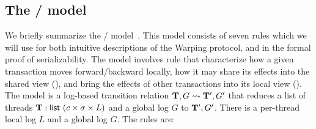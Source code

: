 \newcommand\STEP{{\sc step}}
\newcommand\BEGIN{{\sc begin}}
\newcommand\LOCAL{{\sc local}}
\newcommand\FIN{{\sc fin}}
\newcommand\FORK{{\sc fork}}

\subsection{The \PUSH{}/\PULL{} model}

We briefly summarize the \PUSH{}/\PULL{} model~\cite{KoskinenP15}. This model consists of
seven rules which we will use for both intuitive descriptions of the
Warping protocol, and in the formal proof of serializability.
The \PMPY{} model involves rule that characterize how a given transaction moves forward/backward
locally, how it may share its effects into the shared view (\PUSH),
and bring the effects of other transactions into its local view
(\PULL). 
The  model is a log-based transition relation
$\mathbf{T},G \rightsquigarrow \mathbf{T}', G'$ that reduces
a list of threads $\mathbf{T} : \textsf{list } (c\times \sigma
\times L)$ and a global log $G$ to $\mathbf{T}',G'$.
%
There is a per-thread local log $L$ and a global log $G$.
The rules are:
